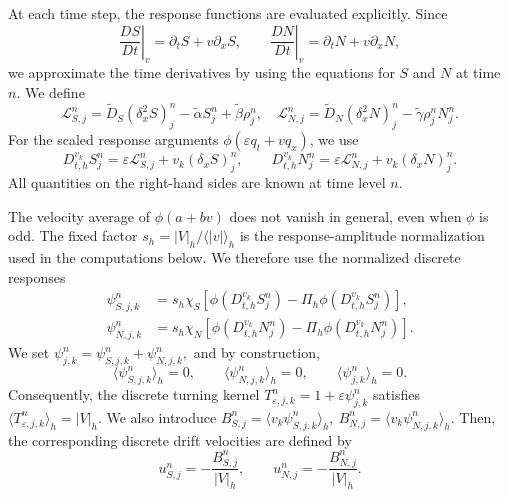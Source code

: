 \documentclass[11pt,twoside]{article}
\numberwithin{equation}{section}
\theoremstyle{plain}
\theoremstyle{nonumberplain}
\newif\ifrevisionred
\DeclareRobustCommand{\st}[1]{{\ifrevisionred\color{red}\fi #1}}
\newenvironment{revisionblock}{\begingroup\ifrevisionred\color{red}\fi}{\endgroup}
\begin{document}
{At each time step, the response functions are evaluated explicitly. Since
\begin{equation}\label{eq: material derivative}
\left.\frac{DS}{Dt}\right|_v=\partial_t S+v\partial_x S,
\qquad
\left.\frac{DN}{Dt}\right|_v =\partial_t N+v\partial_x N,
\end{equation}
we approximate the time derivatives by using the equations for \(S\) and
\(N\) at time \(n\). We define
\[
\mathcal L_{S,j}^n
=
\widetilde D_S(\delta_x^2 S)_j^n
-\widetilde\alpha S_j^n
+\widetilde\beta \rho_j^n,
\quad 
\mathcal L_{N,j}^n
=
\widetilde D_N(\delta_x^2 N)_j^n
-\widetilde\gamma \rho_j^n N_j^n .
\]
\st{For the scaled response arguments $\phi(\varepsilon q_t+v q_x)$, we use}
\[
\st{D_{t,h}^{v_k}S_j^n
=\varepsilon\mathcal L_{S,j}^n+v_k(\delta_x S)_j^n,\qquad
D_{t,h}^{v_k}N_j^n
=\varepsilon\mathcal L_{N,j}^n+v_k(\delta_x N)_j^n.}
\]
All quantities on the right-hand sides are known at time level \(n\).

The velocity average of \(\phi(a+bv)\) does not vanish in general, even
when \(\phi\) is odd. \st{The fixed factor $s_h=|V|_h/\langle|v|\rangle_h$ is the response-amplitude normalization used in the computations below.} We therefore use the normalized discrete responses
\begin{revisionblock}
\[
\begin{aligned}
\psi_{S,j,k}^n&=s_h\chi_S\left[\phi(D_{t,h}^{v_k}S_j^n)-\Pi_h\phi(D_{t,h}^{v_k}S_j^n)\right],\\
\psi_{N,j,k}^n&=s_h\chi_N\left[\phi(D_{t,h}^{v_k}N_j^n)-\Pi_h\phi(D_{t,h}^{v_k}N_j^n)\right].
\end{aligned}
\]
\end{revisionblock}
We set
$\psi_{j,k}^n
=
\psi_{S,j,k}^n+\psi_{N,j,k}^n ,$
and by construction,
\[
\langle \psi_{S,j,k}^n\rangle_h=0,
\qquad
\langle \psi_{N,j,k}^n\rangle_h=0,
\qquad
\langle \psi_{j,k}^n\rangle_h=0.
\]
Consequently, the discrete turning kernel $
T_{\varepsilon,j,k}^n
=
1+\varepsilon \psi_{j,k}^n$
satisfies
$
\langle T_{\varepsilon,j,k}^n\rangle_h=|V|_h.$
We also introduce
$
B_{S,j}^n
=
\langle v_k\psi_{S,j,k}^n\rangle_h,
\
B_{N,j}^n
=
\langle v_k\psi_{N,j,k}^n\rangle_h.
$
Then, the corresponding discrete drift velocities are defined by
\[
u_{S,j}^n
=
-\frac{B_{S,j}^n}{|V|_h},
\qquad
u_{N,j}^n
=
-\frac{B_{N,j}^n}{|V|_h}.
\]

}
\end{document}
